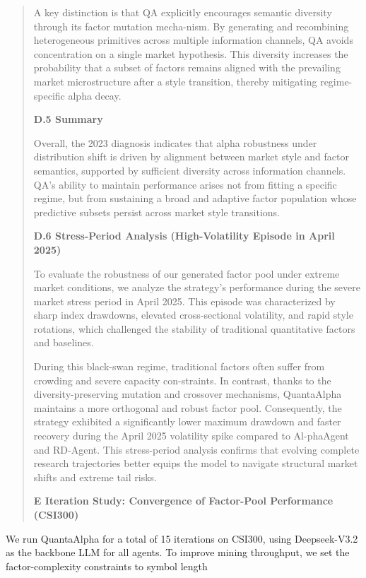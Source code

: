 \documentclass[
]{article}
\begin{document}
\begin{quote}
A key distinction is that QA explicitly encourages semantic diversity
through its factor mutation mecha-nism. By generating and recombining
heterogeneous primitives across multiple information channels, QA avoids
concentration on a single market hypothesis. This diversity increases
the probability that a subset of factors remains aligned with the
prevailing market microstructure after a style transition, thereby
mitigating regime-specific alpha decay.

\textbf{D.5 Summary}

Overall, the 2023 diagnosis indicates that alpha robustness under
distribution shift is driven by alignment between market style and
factor semantics, supported by sufficient diversity across information
channels. QA's ability to maintain performance arises not from fitting a
specific regime, but from sustaining a broad and adaptive factor
population whose predictive subsets persist across market style
transitions.

\textbf{D.6 Stress-Period Analysis (High-Volatility Episode in April
2025)}

To evaluate the robustness of our generated factor pool under extreme
market conditions, we analyze the strategy's performance during the
severe market stress period in April 2025. This episode was
characterized by sharp index drawdowns, elevated cross-sectional
volatility, and rapid style rotations, which challenged the stability of
traditional quantitative factors and baselines.

During this black-swan regime, traditional factors often suffer from
crowding and severe capacity con-straints. In contrast, thanks to the
diversity-preserving mutation and crossover mechanisms, QuantaAlpha
maintains a more orthogonal and robust factor pool. Consequently, the
strategy exhibited a significantly lower maximum drawdown and faster
recovery during the April 2025 volatility spike compared to Al-phaAgent
and RD-Agent. This stress-period analysis confirms that evolving
complete research trajectories better equips the model to navigate
structural market shifts and extreme tail risks.

\textbf{E Iteration Study: Convergence of Factor-Pool Performance
(CSI300)}
\end{quote}

We run QuantaAlpha for a total of 15 iterations on CSI300, using
Deepseek-V3.2 as the backbone LLM for all agents. To improve mining
throughput, we set the factor-complexity constraints to symbol length
\end{document}
